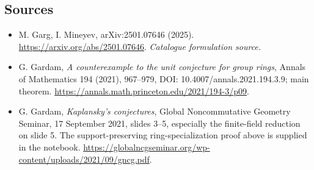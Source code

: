 \documentclass[11pt,a4paper]{article}
\begin{document}
\subsection{Sources}
\begin{itemize}\raggedright
\item[\textnormal{[S1]}]\hypertarget{source:statement:1}{} M. Garg, I. Mineyev, arXiv:2501.07646 (2025).
\url{https://arxiv.org/abs/2501.07646}.
{\small\textit{Catalogue formulation source.}}
\item[\textnormal{[E1]}]\hypertarget{extra:statement:1}{}
G. Gardam, \emph{A counterexample to the unit conjecture for group rings},
Annals of Mathematics 194 (2021), 967--979,
DOI: 10.4007/annals.2021.194.3.9; main theorem.
\url{https://annals.math.princeton.edu/2021/194-3/p09}.
\item[\textnormal{[E2]}]\hypertarget{extra:statement:2}{}
G. Gardam, \emph{Kaplansky's conjectures}, Global Noncommutative Geometry
Seminar, 17 September 2021, slides 3--5, especially the finite-field
reduction on slide 5. The support-preserving ring-specialization proof
above is supplied in the notebook.
\url{https://globalncgseminar.org/wp-content/uploads/2021/09/gncg.pdf}.
\end{itemize}
\end{document}
